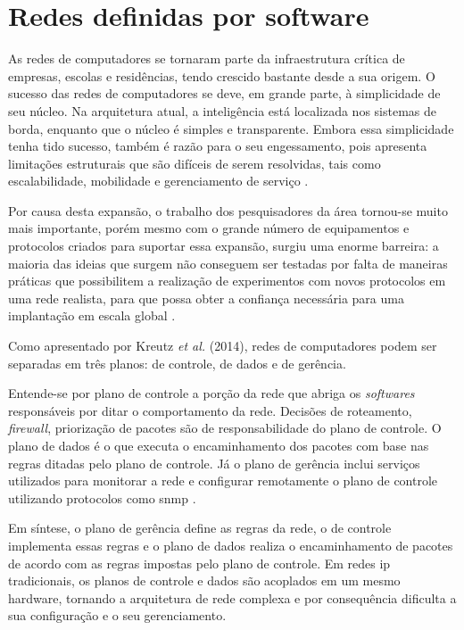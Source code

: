 \section{Redes definidas por software}
\label{sec:sdn-openflow}

As redes de computadores se tornaram parte da infraestrutura crítica de empresas, escolas e residências, tendo crescido bastante desde a sua origem. O sucesso das redes de computadores se deve, em grande parte, à simplicidade de seu núcleo. Na arquitetura atual, a inteligência está localizada nos sistemas de borda, enquanto que o núcleo é simples e transparente. Embora essa simplicidade tenha tido sucesso, também é razão para o seu engessamento, pois apresenta limitações estruturais que são difíceis de serem resolvidas, tais como escalabilidade, mobilidade e gerenciamento de serviço \cite{Clarkl:2004}.

Por causa desta expansão, o trabalho dos pesquisadores da área tornou-se muito mais importante, porém mesmo com o grande número de equipamentos e protocolos criados para suportar essa expansão, surgiu uma enorme barreira: a maioria das ideias que surgem não conseguem ser testadas por falta de maneiras práticas que possibilitem a realização de experimentos com novos protocolos em uma rede realista, para que possa obter a confiança necessária para uma implantação em escala global \cite{McKeown:2008}. 

Como apresentado por Kreutz \textit{et al.} (2014)\nocite{Kreutz:2014}, redes de computadores podem ser separadas em três planos: de controle, de dados e de gerência. 

Entende-se por plano de controle a porção da rede que abriga os \textit{softwares} responsáveis por ditar o comportamento da rede. Decisões de roteamento, \textit{firewall}, priorização de pacotes são de responsabilidade do plano de controle. O plano de dados é o que executa o encaminhamento dos pacotes com base nas regras ditadas pelo plano de controle. Já o plano de gerência inclui serviços utilizados para monitorar a rede e configurar remotamente o plano de controle utilizando protocolos como \gls{snmp} \cite{RFC1157}. 

Em síntese, o plano de gerência define as regras da rede, o de controle implementa essas regras e o plano de dados realiza o encaminhamento de pacotes de acordo com as regras impostas pelo plano de controle. Em redes \gls{ip} tradicionais, os planos de controle e dados são acoplados em um mesmo hardware, tornando a arquitetura de rede complexa e por consequência dificulta a sua configuração e o seu gerenciamento.

